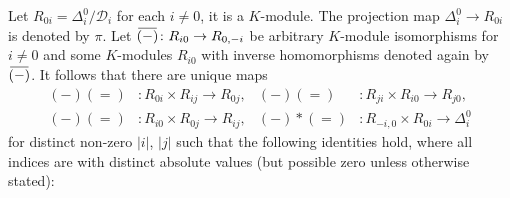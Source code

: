 \documentclass{article}
\theoremstyle{definition}
\newcommand{\inv}[1]{
    \!\;\overline{
        \!\!\:#1\vphantom !\!\!\:
    }\;\!
}
\begin{document}
Let \(R_{0i} = \Delta^0_i / \mathcal D_i\) for each \(i \neq 0\), it is a \(K\)-module. The projection map \(\Delta^0_i \to R_{0i}\) is denoted by \(\pi\). Let \(\inv{(-)} \colon R_{i0} \to R_{0, -i}\) be arbitrary \(K\)-module isomorphisms for \(i \neq 0\) and some \(K\)-modules \(R_{i0}\) with inverse homomorphisms denoted again by \(\inv{(-)}\). It follows that there are unique maps
\begin{align*}
    ({-})({=})
    &\colon R_{0i} \times R_{ij}
    \to R_{0j},
    &
    ({-})({=})
    &\colon R_{ji} \times R_{i0}
    \to R_{j0},
    \\
    ({-})({=})
    &\colon R_{i0} \times R_{0j}
    \to R_{ij},
    &
    ({-}) * ({=})
    &\colon R_{-i, 0} \times R_{0i}
    \to \Delta^0_i
\end{align*}
for distinct non-zero \(|i|\), \(|j|\) such that the following identities hold, where all indices are with distinct absolute values (but possible zero unless otherwise stated):
\end{document}
